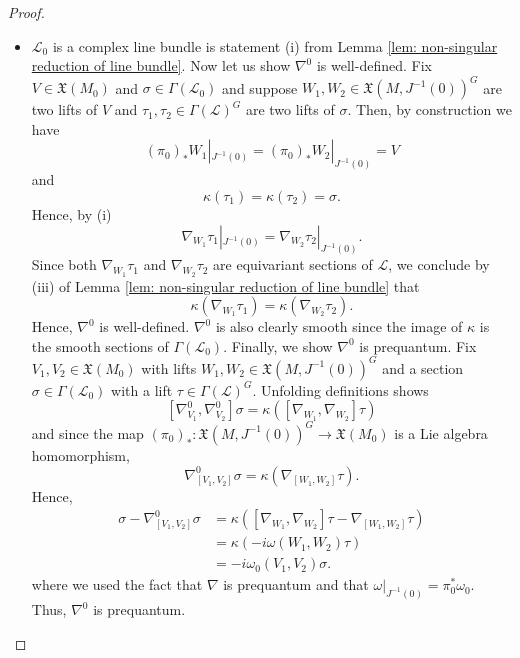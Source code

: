 \documentclass[10pt,a4paper]{amsart}
\newcommand{\mfX}{\mathfrak{X}}
\begin{document}
\begin{proof}
\begin{itemize}
    \item[(ii)] $\mathcal{L}_0$ is a complex line bundle is statement (i) from Lemma \ref{lem: non-singular reduction of line bundle}. Now let us show $\nabla^0$ is well-defined. Fix $V\in\mfX(M_0)$ and $\sigma\in\Gamma(\mathcal{L}_0)$ and suppose $W_1,W_2\in\mfX(M,J^{-1}(0))^G$ are two lifts of $V$ and $\tau_1,\tau_2\in \Gamma(\mathcal{L})^G$ are two lifts of $\sigma$. Then, by construction we have
    $$
    (\pi_0)_*W_1|_{J^{-1}(0)}=(\pi_0)_*W_2|_{J^{-1}(0)}=V
    $$
    and
    $$
    \kappa(\tau_1)=\kappa(\tau_2)=\sigma.
    $$
    Hence, by (i)
    $$
    \nabla_{W_1}\tau_1|_{J^{-1}(0)}=\nabla_{W_2}\tau_2|_{J^{-1}(0)}.
    $$
    Since both $\nabla_{W_1}\tau_1$ and $\nabla_{W_2}\tau_2$ are equivariant sections of $\mathcal{L}$, we conclude by (iii) of Lemma \ref{lem: non-singular reduction of line bundle} that
    $$
    \kappa(\nabla_{W_1}\tau_1)=\kappa(\nabla_{W_2}\tau_2).
    $$
    Hence, $\nabla^0$ is well-defined. $\nabla^0$ is also clearly smooth since the image of $\kappa$ is the smooth sections of $\Gamma(\mathcal{L}_0)$. Finally, we show $\nabla^0$ is prequantum. Fix $V_1,V_2\in\mfX(M_0)$ with lifts $W_1,W_2\in\mfX(M,J^{-1}(0))^G$ and a section $\sigma\in\Gamma(\mathcal{L}_0)$ with a lift $\tau\in\Gamma(\mathcal{L})^G$. Unfolding definitions shows
    $$
    [\nabla^0_{V_1},\nabla^0_{V_2}]\sigma=\kappa([\nabla_{W_1},\nabla_{W_2}]\tau)
    $$
    and since the map $(\pi_0)_*:\mfX(M,J^{-1}(0))^G\to \mfX(M_0)$ is a Lie algebra homomorphism,
    $$
    \nabla^0_{[V_1,V_2]}\sigma=\kappa(\nabla_{[W_1,W_2]}\tau).
    $$
    Hence,
    \begin{align*}
    [\nabla^0_{V_1},\nabla^0_{V_2}]\sigma-\nabla^0_{[V_1,V_2]}\sigma&=\kappa([\nabla_{W_1},\nabla_{W_2}]\tau-\nabla_{[W_1,W_2]}\tau)\\
    &=\kappa(-i \omega(W_1,W_2)\tau)\\
    &=-i \omega_0(V_1,V_2)\sigma.
    \end{align*}
    where we used the fact that $\nabla$ is prequantum and that $\omega|_{J^{-1}(0)}=\pi_0^*\omega_0$. Thus, $\nabla^0$ is prequantum.
\end{itemize}
\end{proof}
\end{document}
